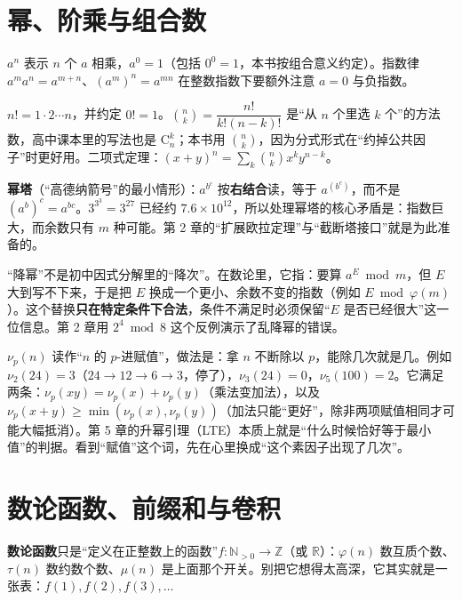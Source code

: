 \documentclass[UTF8,a4paper,11pt,twoside,openright,fontset=fandol]{ctexbook}
\theoremstyle{definition}
\newcommand{\Z}{\mathbb Z}
\newcommand{\N}{\mathbb N}
\begin{document}
\section{幂、阶乘与组合数}
$a^n$ 表示 $n$ 个 $a$ 相乘，$a^0=1$（包括 $0^0=1$，本书按组合意义约定）。指数律 $a^{m}a^{n}=a^{m+n}$、$(a^m)^n=a^{mn}$ 在整数指数下要额外注意 $a=0$ 与负指数。

$n!=1\cdot2\cdots n$，并约定 $0!=1$。$\binom{n}{k}=\dfrac{n!}{k!(n-k)!}$ 是“从 $n$ 个里选 $k$ 个”的方法数，高中课本里的写法也是 $\mathrm{C}_n^k$；本书用 $\binom{n}{k}$，因为分式形式在“约掉公共因子”时更好用。二项式定理：$(x+y)^n=\sum_{k}\binom{n}{k}x^{k}y^{n-k}$。

\textbf{幂塔}（“高德纳箭号”的最小情形）：$a^{b^{c}}$ 按\textbf{右结合}读，等于 $a^{(b^c)}$，而不是 $(a^b)^c=a^{bc}$。$3^{3^{3}}=3^{27}$ 已经约 $7.6\times10^{12}$，所以处理幂塔的核心矛盾是：指数巨大，而余数只有 $m$ 种可能。第 2 章的“扩展欧拉定理”与“截断塔接口”就是为此准备的。

\begin{tip}[“降幂”是什么意思]
“降幂”不是初中因式分解里的“降次”。在数论里，它指：要算 $a^E\bmod m$，但 $E$ 大到写不下来，于是把 $E$ 换成一个更小、余数不变的指数（例如 $E\bmod\varphi(m)$）。这个替换\textbf{只在特定条件下合法}，条件不满足时必须保留“$E$ 是否已经很大”这一位信息。第 2 章用 $2^4\bmod 8$ 这个反例演示了乱降幂的错误。
\end{tip}

\begin{tip}
$\nu_p(n)$ 读作“$n$ 的 $p$-进赋值”，做法是：拿 $n$ 不断除以 $p$，能除几次就是几。例如 $\nu_2(24)=3$（$24\to12\to6\to3$，停了），$\nu_3(24)=0$，$\nu_5(100)=2$。它满足两条：$\nu_p(xy)=\nu_p(x)+\nu_p(y)$（乘法变加法），以及 $\nu_p(x+y)\ge\min(\nu_p(x),\nu_p(y))$（加法只能“更好”，除非两项赋值相同才可能大幅抵消）。第 5 章的升幂引理（LTE）本质上就是“什么时候恰好等于最小值”的判据。看到“赋值”这个词，先在心里换成“这个素因子出现了几次”。
\end{tip}

\section{数论函数、前缀和与卷积}
\textbf{数论函数}只是“定义在正整数上的函数”$f:\N_{>0}\to\Z$（或 $\mathbb R$）：$\varphi(n)$ 数互质个数、$\tau(n)$ 数约数个数、$\mu(n)$ 是上面那个开关。别把它想得太高深，它其实就是一张表：$f(1),f(2),f(3),\ldots$
\end{document}
